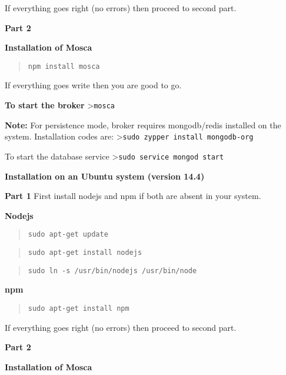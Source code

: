 \documentclass[16pt]{article}
\begin{document}
\begin{enumerate}
If everything goes right (no errors) then proceed to second part.
 \vspace{0.5cm}

\textbf{Part 2}

\textbf{Installation of Mosca}

\begin{quote}
\texttt{npm install mosca}
\end{quote}

If everything goes write then you are good to go.
 \vspace{0.5cm}

\textbf{To start the broker} \textgreater{}\texttt{mosca}

\textbf{Note:} For persistence mode, broker requires mongodb/redis
installed on the system. Installation codes are:
\textgreater{}\texttt{sudo zypper install mongodb-org}

To start the database service
\textgreater{}\texttt{sudo service mongod start}
 \vspace{0.5cm}


\textbf{Installation on an Ubuntu system (version
14.4)}

\textbf{Part 1} First install nodejs and npm if both are absent in your
system.

\textbf{Nodejs}

\begin{quote}
\texttt{sudo apt-get update}
\end{quote}

\begin{quote}
\texttt{sudo apt-get install nodejs}
\end{quote}

\begin{quote}
\texttt{sudo ln -s /usr/bin/nodejs /usr/bin/node}
\end{quote}

\textbf{npm}

\begin{quote}
\texttt{sudo apt-get install npm}
\end{quote}

If everything goes right (no errors) then proceed to second part.

 \vspace{0.3cm}

\textbf{Part 2}

\textbf{Installation of Mosca}


\end{enumerate}
\end{document}
